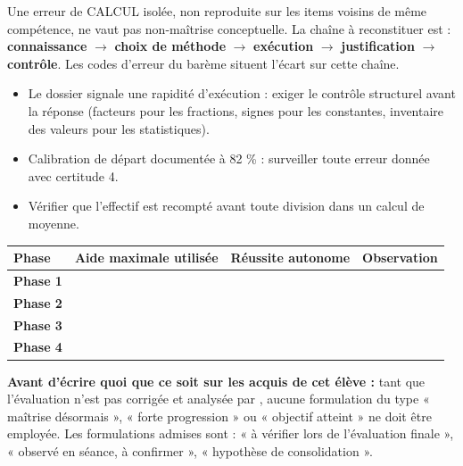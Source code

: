 \documentclass[10pt,a4paper]{article}
\begin{document}
Une erreur de \textsc{CALCUL} isolée, non reproduite sur les items voisins de même compétence, ne vaut pas non-maîtrise conceptuelle. La chaîne à reconstituer est : \textbf{connaissance} $\rightarrow$ \textbf{choix de méthode} $\rightarrow$ \textbf{exécution} $\rightarrow$ \textbf{justification} $\rightarrow$ \textbf{contrôle}. Les codes d'erreur du barème situent l'écart sur cette chaîne.
\begin{itemize}\item Le dossier signale une rapidité d'exécution : exiger le contrôle structurel avant la réponse (facteurs pour les fractions, signes pour les constantes, inventaire des valeurs pour les statistiques).\item Calibration de départ documentée à 82 \% : surveiller toute erreur donnée avec certitude 4.\item Vérifier que l'effectif est recompté avant toute division dans un calcul de moyenne.\end{itemize}
\par\noindent\begin{tabularx}{\linewidth}{>{\bfseries}p{26mm} X X X}
\toprule Phase & Aide maximale utilisée & Réussite autonome & Observation \\ \midrule
Phase 1 & & & \\[6mm]
Phase 2 & & & \\[6mm]
Phase 3 & & & \\[6mm]
Phase 4 & & & \\[6mm]
\bottomrule\end{tabularx}
\begin{warningbox}\textbf{Avant d'écrire quoi que ce soit sur les acquis de cet élève :} tant que l'évaluation n'est pas corrigée et analysée par , aucune formulation du type « maîtrise désormais », « forte progression » ou « objectif atteint » ne doit être employée. Les formulations admises sont : « à vérifier lors de l'évaluation finale », « observé en séance, à confirmer », « hypothèse de consolidation ».\end{warningbox}
\end{document}
